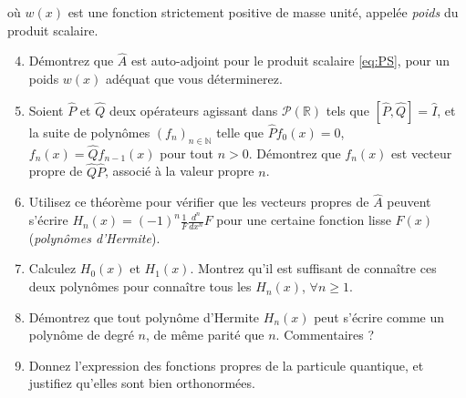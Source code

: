 où $w(x)$ est une fonction strictement positive de masse unité, appelée \textit{poids} du produit scalaire. 
\begin{enumerate}
\setcounter{enumi}{3}
\item Démontrez que $\hat A$ est auto-adjoint pour le produit scalaire \eqref{eq:PS}, pour un poids $w(x)$ adéquat que vous déterminerez. 
\item Soient $\hat P$ et $\hat Q$ deux opérateurs agissant dans $\mathcal P(\mathbb R)$ tels que $[\hat P,\hat Q]=\hat I$, et la suite de polynômes $(f_n)_{n\in\mathbb N}$ telle que $\hat Pf_0(x) = 0$, $f_n(x) = \hat Qf_{n-1}(x)$ pour tout $n>0$. Démontrez que $f_n(x)$ est vecteur propre de $\hat Q\hat P$, associé à la valeur propre $n$.
\item Utilisez ce théorème pour vérifier que les vecteurs propres de $\hat A$ peuvent s'écrire $H_n(x) = (-1)^n \frac{1}{F}\frac{d^n}{dx^n}F$ pour une certaine fonction lisse $F(x)$ (\textit{polynômes d'Hermite}).
\item Calculez $H_0(x)$ et $H_1(x)$. Montrez qu'il est suffisant de connaître ces deux polynômes pour connaître tous les $H_n(x)$, $\forall n\geq 1$.
\item Démontrez que tout polynôme d'Hermite $H_n(x)$ peut s'écrire comme un polynôme de degré $n$, de même parité que $n$. Commentaires ?
\item Donnez l'expression des fonctions propres de la particule quantique, et justifiez qu'elles sont bien orthonormées.
\end{enumerate}

